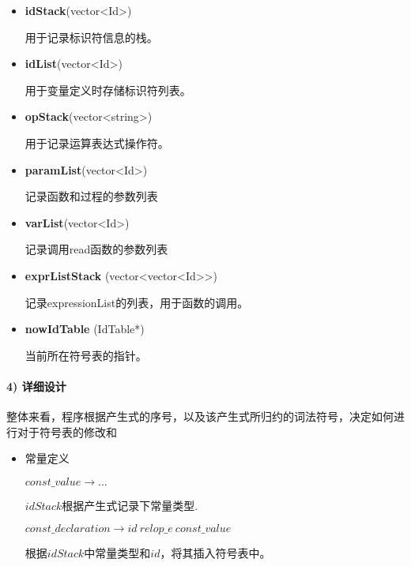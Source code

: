 \documentclass[]{ctexart}
\let\oldparagraph\paragraph
\renewcommand{\paragraph}[1]{\oldparagraph{#1}\mbox{}}
\begin{document}
\begin{itemize}
\item
  \textbf{idStack}(vector\textless{}Id\textgreater{})

  用于记录标识符信息的栈。
\item
  \textbf{idList}(vector\textless{}Id\textgreater{})

  用于变量定义时存储标识符列表。
\item
  \textbf{opStack}(vector\textless{}string\textgreater{})

  用于记录运算表达式操作符。
\item
  \textbf{paramList}(vector\textless{}Id\textgreater{})

  记录函数和过程的参数列表
\item
  \textbf{varList}(vector\textless{}Id\textgreater{})

  记录调用read函数的参数列表
\item
  \textbf{exprListStack}
  (vector\textless{}vector\textless{}Id\textgreater{}\textgreater{})

  记录expressionList的列表，用于函数的调用。
\item
  \textbf{nowIdTable} (IdTable*)

  当前所在符号表的指针。
\end{itemize}

\hypertarget{header-n163}{%
\paragraph{4) 详细设计}\label{header-n163}}

整体来看，程序根据产生式的序号，以及该产生式所归约的词法符号，决定如何进行对于符号表的修改和

\begin{itemize}
\item
  常量定义

  \(const\_value \to ...\)

  \(idStack\)根据产生式记录下常量类型.

  \(const\_declaration\to id\ relop\_e\ const\_value\)

  根据\(idStack\)中常量类型和\(id\)，将其插入符号表中。
\end{itemize}
\end{document}
